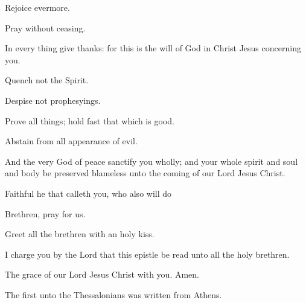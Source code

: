 {Rejoice
evermore.

Pray without
ceasing.

In every
thing give
thanks:
for
this is the
will of
God
in
Christ
Jesus
concerning
you.

Quench
not the
Spirit.

Despise
not
prophesyings.

Prove all
things; hold
fast that which is
good.

Abstain
from
all
appearance of
evil.

And the
very
God of
peace
sanctify
you
wholly;
and
{}
your
whole
spirit
and
soul
and
body be
preserved
blameless
unto the
coming of
our
Lord
Jesus
Christ.

Faithful
{} he that
calleth
you,
who
also will
do
{}

Brethren,
pray
for
us.


\par }{\PP {}Greet
all the
brethren
with an
holy
kiss.

I
charge
you by the
Lord
that
this
epistle be
read unto
all the
holy
brethren.

The
grace of
our
Lord
Jesus
Christ
{}
with
you.
Amen.


\par }{\SH The first
{} unto the Thessalonians was written from Athens.
\par }
